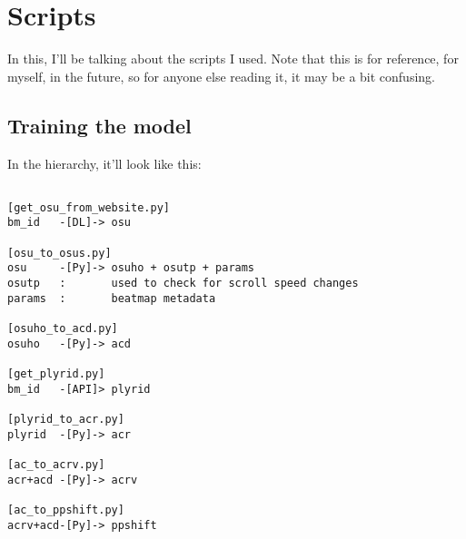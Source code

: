 

\section{Scripts}

In this, I'll be talking about the scripts I used. Note that this is for reference, for myself, in the future, so for anyone else reading it, it may be a bit confusing.

\subsection{Training the model}

In the hierarchy, it'll look like this:

\begin{lstlisting}

[get_osu_from_website.py]
bm_id 	-[DL]-> osu

[osu_to_osus.py]
osu  	-[Py]-> osuho + osutp + params
osutp	: 		used to check for scroll speed changes
params	: 		beatmap metadata

[osuho_to_acd.py]
osuho	-[Py]->	acd

[get_plyrid.py]
bm_id	-[API]> plyrid

[plyrid_to_acr.py]
plyrid	-[Py]-> acr

[ac_to_acrv.py]
acr+acd	-[Py]-> acrv

[ac_to_ppshift.py]
acrv+acd-[Py]-> ppshift

\end{lstlisting}



